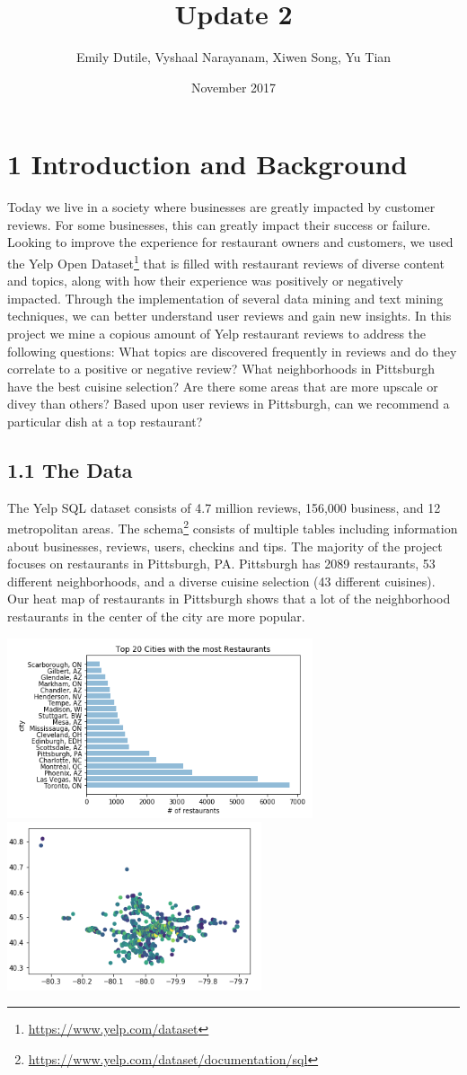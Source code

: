 \documentclass{neu_handout}
\title{Update 2}
\author{Emily Dutile, Vyshaal Narayanam, Xiwen Song, Yu Tian}
\date{November 2017}
\begin{document}
\section*{1 Introduction and Background}
Today we live in a society where businesses are greatly impacted by customer reviews. For some businesses, this can greatly impact their success or failure. Looking to improve the
experience for restaurant owners and customers, we used the Yelp Open Dataset\footnote{\url{https://www.yelp.com/dataset}} that is filled with restaurant reviews of diverse content and topics, along with how their experience was positively or negatively impacted. Through the implementation of several data mining and text mining techniques, we can better understand user reviews and gain new insights. In this project we mine a copious amount of Yelp restaurant reviews to address the following questions: What topics are discovered frequently in reviews and do they correlate to a positive or negative review? What neighborhoods in Pittsburgh have the best cuisine selection? Are there some areas that are more upscale or divey than others? Based upon user reviews in Pittsburgh, can we recommend a particular dish at a top restaurant?

\subsection*{1.1 The Data}
The Yelp SQL dataset consists of 4.7 million reviews, 156,000 business, and 12 metropolitan areas. The schema\footnote{\url{https://www.yelp.com/dataset/documentation/sql}} consists of multiple tables including information about businesses, reviews, users, checkins and tips. The majority of the project focuses on restaurants in Pittsburgh, PA. Pittsburgh has 2089 restaurants, 53 different neighborhoods, and a diverse cuisine selection (43 different cuisines). Our heat map of restaurants in Pittsburgh shows that a lot of the neighborhood restaurants in the center of the city are more popular.

\begin{center}
\includegraphics[width=90mm,scale=0.5]{cities}
\includegraphics[width=75mm,scale=0.5]{pa_popular_restaurants}
\end{center}
\end{document}
